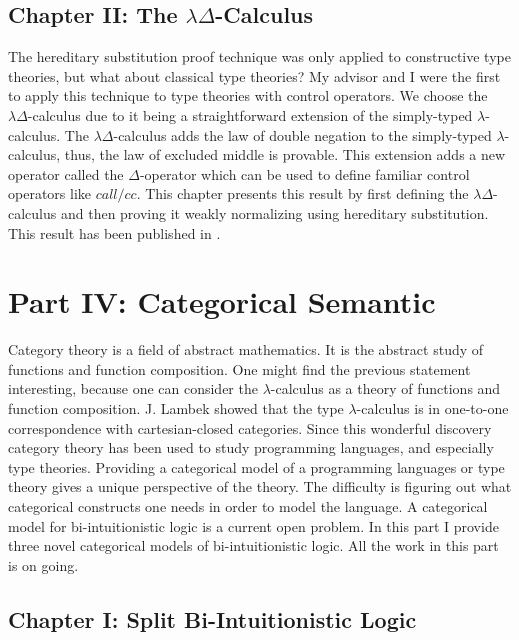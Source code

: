 \subsection{Chapter II: The $\lambda\Delta$-Calculus}
\label{subsec:the_lambdadelta-calculus}
The hereditary substitution proof technique was only applied to
constructive type theories, but what about classical type theories? My
advisor and I were the first to apply this technique to type theories
with control operators.  We choose the $\lambda\Delta$-calculus due to
it being a straightforward extension of the simply-typed
$\lambda$-calculus.  The $\lambda\Delta$-calculus adds the law of
double negation to the simply-typed $\lambda$-calculus, thus, the law
of excluded middle is provable.  This extension adds a new operator
called the $\Delta$-operator which can be used to define familiar
control operators like $call/cc$.  This chapter presents this result
by first defining the $\lambda\Delta$-calculus and then proving it
weakly normalizing using hereditary substitution.  This result has
been published in \cite{Eades:2013}.


\section{Part IV: Categorical Semantic }
\label{sec:categorical_semantics}

Category theory is a field of abstract mathematics.  It is the
abstract study of functions and function composition.  One might find
the previous statement interesting, because one can consider the
$\lambda$-calculus as a theory of functions and function composition.
J. Lambek showed that the type $\lambda$-calculus is in one-to-one
correspondence with cartesian-closed categories.  Since this wonderful
discovery category theory has been used to study programming
languages, and especially type theories.  Providing a categorical
model of a programming languages or type theory gives a unique
perspective of the theory.  The difficulty is figuring out what
categorical constructs one needs in order to model the language.  A
categorical model for bi-intuitionistic logic is a current open
problem.  In this part I provide three novel categorical models of
bi-intuitionistic logic.  All the work in this part is on going.

\subsection{Chapter I: Split Bi-Intuitionistic Logic}
\label{subsec:split_bi-intuitionistic_logic}


